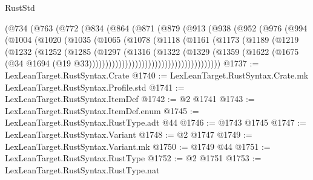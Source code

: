 \begin{lexlean}{RustStd}
\begin{coremodule}
{\begin{coremodule}
{{{{{{{{{{{{{{{{{{{{{{{{{{{{{{{{{{{{{{{{{{{                (@734
                  (@763
                    (@772
                      (@834
                        (@864
                          (@871
                            (@879
                              (@913
                                (@938
                                  (@952
                                    (@976
                                      (@994
                                        (@1004
                                          (@1020
                                            (@1035
                                              (@1065
                                                (@1078
                                                  (@1118
                                                    (@1161
                                                      (@1173
                                                        (@1189
                                                          (@1219
                                                            (@1232
                                                              (@1252
                                                                (@1285
                                                                  (@1297
                                                                    (@1316
                                                                      (@1322
                                                                        (@1329
                                                                          (@1359
                                                                            (@1622
                                                                              (@1675
                                                                                (@34
                                                                                  @1694
                                                                                  (@19
                                                                                    @33))))))))))))))))))))))))))))))))))))))))
@1737 := LexLeanTarget.RustSyntax.Crate
@1740 := LexLeanTarget.RustSyntax.Crate.mk LexLeanTarget.RustSyntax.Profile.std
@1741 := LexLeanTarget.RustSyntax.ItemDef
@1742 := @2 @1741
@1743 := LexLeanTarget.RustSyntax.ItemDef.enum
@1745 := LexLeanTarget.RustSyntax.RustType.adt @44
@1746 := @1743 @1745
@1747 := LexLeanTarget.RustSyntax.Variant
@1748 := @2 @1747
@1749 := LexLeanTarget.RustSyntax.Variant.mk
@1750 := @1749 @44
@1751 := LexLeanTarget.RustSyntax.RustType
@1752 := @2 @1751
@1753 := LexLeanTarget.RustSyntax.RustType.nat
}}}}}}}}}}}}}}}}}}}}}}}}}}}}}}}}}}}}}}}}}}}
\end{coremodule}}
\end{coremodule}
\end{lexlean}

